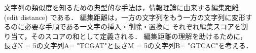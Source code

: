 文字列の類似度を知るための典型的な手法は，情報理論に由来する編集距離 (edit distance) である．
編集距離は，一方の文字列をもう一方の文字列に変形するのに必要な手順である一文字の挿入・削除・置換に
それぞれ編集スコアを割り当て，そのスコアの和として定義される．
編集距離の理解を助けるために，長さN = 5の文字列A= "TCGAT"と長さM = 5の文字列B= "GTCAC"を考える．
\begin{figure}[t!]
\begin{center}
\\
\\
\subfigure[]{
}
\end{center}
\end{figure}
